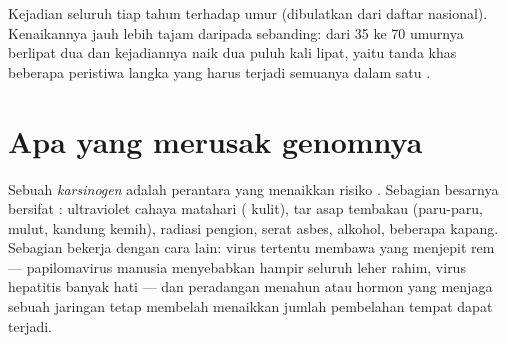 \begin{omfigure}

{\small Kejadian seluruh  tiap tahun terhadap umur (dibulatkan
dari daftar nasional). Kenaikannya jauh lebih tajam daripada sebanding:
dari 35 ke 70 umurnya berlipat dua dan kejadiannya naik dua puluh kali
lipat, yaitu tanda khas beberapa peristiwa langka yang harus terjadi
semuanya dalam satu .}
\end{omfigure}

\section{Apa yang merusak genomnya}

\begin{definition}[Karsinogen]\label{def:g11:cancer:carcinogen}
Sebuah \emph{karsinogen} adalah perantara yang
menaikkan risiko . Sebagian besarnya bersifat :
ultraviolet cahaya matahari ( kulit), tar asap tembakau
(paru-paru, mulut, kandung kemih), radiasi pengion, serat asbes,
alkohol, beberapa kapang. Sebagian bekerja dengan cara lain: virus
tertentu membawa  yang menjepit rem  --- papilomavirus manusia
menyebabkan hampir seluruh  leher rahim, virus hepatitis banyak
 hati --- dan peradangan menahun atau hormon yang menjaga sebuah
jaringan tetap membelah menaikkan jumlah pembelahan tempat  dapat
terjadi.
\end{definition}

